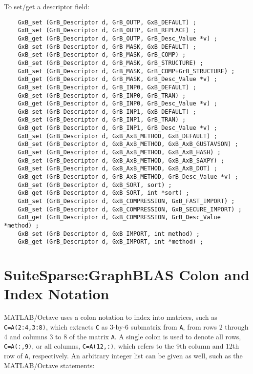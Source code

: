 \documentclass[12pt]{article}
\begin{document}
\noindent
To set/get a descriptor field:

    {\footnotesize
    \begin{verbatim}
    GxB_set (GrB_Descriptor d, GrB_OUTP, GxB_DEFAULT) ;
    GxB_set (GrB_Descriptor d, GrB_OUTP, GrB_REPLACE) ;
    GxB_get (GrB_Descriptor d, GrB_OUTP, GrB_Desc_Value *v) ;
    GxB_set (GrB_Descriptor d, GrB_MASK, GxB_DEFAULT) ;
    GxB_set (GrB_Descriptor d, GrB_MASK, GrB_COMP) ;
    GxB_set (GrB_Descriptor d, GrB_MASK, GrB_STRUCTURE) ;
    GxB_set (GrB_Descriptor d, GrB_MASK, GrB_COMP+GrB_STRUCTURE) ;
    GxB_get (GrB_Descriptor d, GrB_MASK, GrB_Desc_Value *v) ;
    GxB_set (GrB_Descriptor d, GrB_INP0, GxB_DEFAULT) ;
    GxB_set (GrB_Descriptor d, GrB_INP0, GrB_TRAN) ;
    GxB_get (GrB_Descriptor d, GrB_INP0, GrB_Desc_Value *v) ;
    GxB_set (GrB_Descriptor d, GrB_INP1, GxB_DEFAULT) ;
    GxB_set (GrB_Descriptor d, GrB_INP1, GrB_TRAN) ;
    GxB_get (GrB_Descriptor d, GrB_INP1, GrB_Desc_Value *v) ;
    GxB_set (GrB_Descriptor d, GxB_AxB_METHOD, GxB_DEFAULT) ;
    GxB_set (GrB_Descriptor d, GxB_AxB_METHOD, GxB_AxB_GUSTAVSON) ;
    GxB_set (GrB_Descriptor d, GxB_AxB_METHOD, GxB_AxB_HASH) ;
    GxB_set (GrB_Descriptor d, GxB_AxB_METHOD, GxB_AxB_SAXPY) ;
    GxB_set (GrB_Descriptor d, GxB_AxB_METHOD, GxB_AxB_DOT) ;
    GxB_get (GrB_Descriptor d, GrB_AxB_METHOD, GrB_Desc_Value *v) ;
    GxB_set (GrB_Descriptor d, GxB_SORT, sort) ;
    GxB_get (GrB_Descriptor d, GxB_SORT, int *sort) ;
    GxB_set (GrB_Descriptor d, GxB_COMPRESSION, GxB_FAST_IMPORT) ;
    GxB_set (GrB_Descriptor d, GxB_COMPRESSION, GxB_SECURE_IMPORT) ;
    GxB_get (GrB_Descriptor d, GxB_COMPRESSION, GrB_Desc_Value *method) ;
    GxB_set (GrB_Descriptor d, GxB_IMPORT, int method) ;
    GxB_get (GrB_Descriptor d, GxB_IMPORT, int *method) ; \end{verbatim} }

\newpage
\section{SuiteSparse:GraphBLAS Colon and Index Notation} %
\label{colon}

MATLAB/Octave uses a colon notation to index into matrices, such as
\verb'C=A(2:4,3:8)', which extracts \verb'C' as 3-by-6 submatrix from \verb'A',
from rows 2 through 4 and columns 3 to 8 of the matrix \verb'A'.  A single
colon is used to denote all rows, \verb'C=A(:,9)', or all columns,
\verb'C=A(12,:)', which refers to the 9th column and 12th row of \verb'A',
respectively.  An arbitrary integer list can be given as well, such as the
MATLAB/Octave statements:
\end{document}
